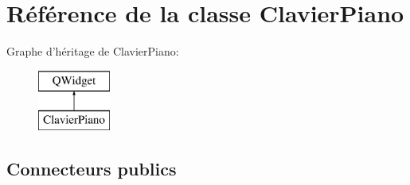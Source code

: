 \section{Référence de la classe Clavier\-Piano}
\label{class_clavier_piano}
Graphe d'héritage de Clavier\-Piano\-:\begin{figure}[H]
\begin{center}
\leavevmode
\includegraphics[height=2.000000cm]{class_clavier_piano}
\end{center}
\end{figure}
\subsection*{Connecteurs publics}
